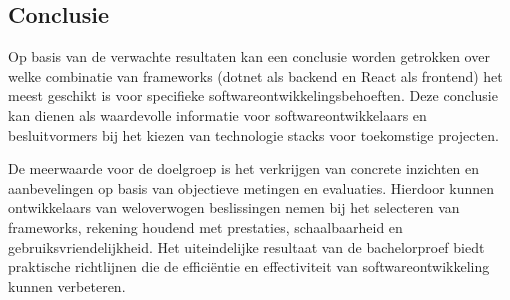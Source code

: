 \documentclass{hogent-article}
\begin{document}
\subsection{Conclusie}
Op basis van de verwachte resultaten kan een conclusie worden getrokken over welke combinatie van frameworks (dotnet als backend en React als frontend) het meest geschikt is voor specifieke softwareontwikkelingsbehoeften. Deze conclusie kan dienen als waardevolle informatie voor softwareontwikkelaars en besluitvormers bij het kiezen van technologie stacks voor toekomstige projecten.

De meerwaarde voor de doelgroep is het verkrijgen van concrete inzichten en aanbevelingen op basis van objectieve metingen en evaluaties. Hierdoor kunnen ontwikkelaars van weloverwogen beslissingen nemen bij het selecteren van frameworks, rekening houdend met pre\-sta\-ties, schaalbaarheid en gebruiksvriendelijkheid. Het uiteindelijke resultaat van de bachelorproef biedt praktische richtlijnen die de efficiëntie en effectiviteit van softwareontwikkeling kunnen verbeteren.
\printbibliography[heading=bibintoc]
\end{document}

